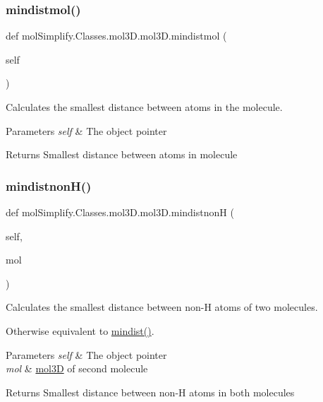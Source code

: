 \subsubsection{\texorpdfstring{mindistmol()}{mindistmol()}}
{\footnotesize\ttfamily def mol\+Simplify.\+Classes.\+mol3\+D.\+mol3\+D.\+mindistmol (\begin{DoxyParamCaption}\item[{}]{self }\end{DoxyParamCaption})}



Calculates the smallest distance between atoms in the molecule. 


\begin{DoxyParams}{Parameters}
{\em self} & The object pointer \\
\hline
\end{DoxyParams}
\begin{DoxyReturn}{Returns}
Smallest distance between atoms in molecule 
\end{DoxyReturn}
\mbox{\label{classmolSimplify_1_1Classes_1_1mol3D_1_1mol3D_a613d343492efdeda0c47700654157b3d}} 
\subsubsection{\texorpdfstring{mindistnon\+H()}{mindistnonH()}}
{\footnotesize\ttfamily def mol\+Simplify.\+Classes.\+mol3\+D.\+mol3\+D.\+mindistnonH (\begin{DoxyParamCaption}\item[{}]{self,  }\item[{}]{mol }\end{DoxyParamCaption})}



Calculates the smallest distance between non-\/H atoms of two molecules. 

Otherwise equivalent to \hyperlink{classmolSimplify_1_1Classes_1_1mol3D_1_1mol3D_ab051fea5908eab8ddcd39d4ea4688657}{mindist()}. 
\begin{DoxyParams}{Parameters}
{\em self} & The object pointer \\
\hline
{\em mol} & \hyperlink{classmolSimplify_1_1Classes_1_1mol3D_1_1mol3D}{mol3D} of second molecule \\
\hline
\end{DoxyParams}
\begin{DoxyReturn}{Returns}
Smallest distance between non-\/H atoms in both molecules 
\end{DoxyReturn}
\mbox{\label{classmolSimplify_1_1Classes_1_1mol3D_1_1mol3D_a9002b30e6f3e13fb41c0080f4fec6ce1}} 
